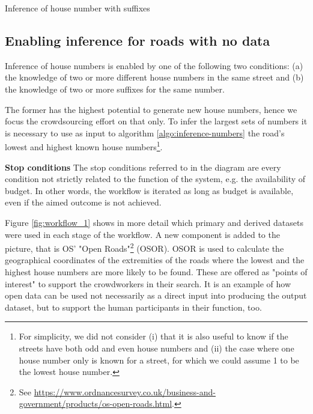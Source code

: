 \vspace{5mm}

\begin{algorithm}[H]
    \caption{Inference of house number with suffixes}
    \label{algo:inference-numbers-suffix}
\end{algorithm}

\subsection{Enabling inference for roads with no data} 

Inference of house numbers is enabled by one of the following two conditions: (a) the knowledge of two or more different house numbers in the same street and (b) the knowledge of two or more suffixes for the same number. 

The former has the highest potential to generate new house numbers, hence we focus the crowdsourcing effort on that only. To infer the largest sets of numbers it is necessary to use as input to algorithm \ref{algo:inference-numbers} the road's lowest and highest known house numbers\footnote{For simplicity, we did not consider (i) that it is also useful to know if the streets have both odd and even house numbers and (ii) the case where one house number only is known for a street, for which we could assume 1 to be the lowest house number.}.

\textbf{Stop conditions} The stop conditions referred to in the diagram are every condition not strictly related to the function of the system, e.g. the availability of budget. In other words, the workflow is iterated as long as budget is available, even if the aimed outcome is not achieved. 

Figure \ref{fig:workflow_1} shows in more detail which primary and derived datasets were used in each stage of the workflow. A new component is added to the picture, that is OS' "Open Roads"\footnote{See \url{https://www.ordnancesurvey.co.uk/business-and-government/products/os-open-roads.html}.} (OSOR). OSOR is used to calculate the geographical coordinates of the extremities of the roads where the lowest and the highest house numbers are more likely to be found. These are offered as "points of interest" to support the crowdworkers in their search. It is an example of how open data can be used not necessarily as a direct input into producing the output dataset, but to support the human participants in their function, too.

